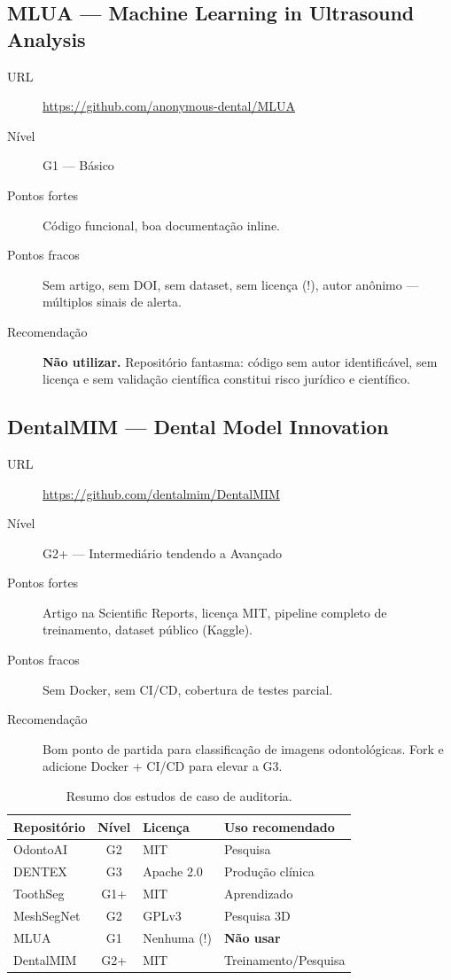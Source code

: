 \subsection{MLUA — Machine Learning in Ultrasound Analysis}

\begin{description}
  \item[URL] \url{https://github.com/anonymous-dental/MLUA}
  \item[Nível] G1 — Básico
  \item[Pontos fortes] Código funcional, boa documentação inline.
  \item[Pontos fracos] Sem artigo, sem DOI, sem dataset, sem licença (!),
    autor anônimo — múltiplos sinais de alerta.
  \item[Recomendação] \textbf{Não utilizar.} Repositório fantasma: código
    sem autor identificável, sem licença e sem validação científica
    constitui risco jurídico e científico.
\end{description}

\subsection{DentalMIM — Dental Model Innovation}

\begin{description}
  \item[URL] \url{https://github.com/dentalmim/DentalMIM}
  \item[Nível] G2+ — Intermediário tendendo a Avançado
  \item[Pontos fortes] Artigo na Scientific Reports, licença MIT,
    pipeline completo de treinamento, dataset público (Kaggle).
  \item[Pontos fracos] Sem Docker, sem CI/CD, cobertura de testes parcial.
  \item[Recomendação] Bom ponto de partida para classificação de imagens
    odontológicas. Fork e adicione Docker + CI/CD para elevar a G3.
\end{description}

\begin{table}[H]
  \centering
  \caption{Resumo dos estudos de caso de auditoria.}
  \label{tab:audit-summary}
  \begin{tabularx}{\textwidth}{lclX}
    \toprule
    \textbf{Repositório} & \textbf{Nível} & \textbf{Licença} & \textbf{Uso recomendado} \\
    \midrule
    OdontoAI & G2 & MIT & Pesquisa \\
    DENTEX & G3 & Apache 2.0 & Produção clínica \\
    ToothSeg & G1+ & MIT & Aprendizado \\
    MeshSegNet & G2 & GPLv3 & Pesquisa 3D \\
    MLUA & G1 & Nenhuma (!) & \textbf{Não usar} \\
    DentalMIM & G2+ & MIT & Treinamento/Pesquisa \\
    \bottomrule
  \end{tabularx}
\end{table}

